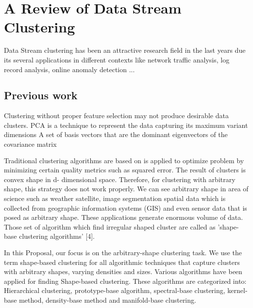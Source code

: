 \chapter{A Review of Data Stream Clustering}

Data Stream clustering has been an attractive research field in the last years due its several applications in different contexts like network traffic analysis, log record analysis, online anomaly detection ...


\section{Previous work}


Clustering without proper feature selection may not produce desirable data clusters.
PCA is a technique to represent the data capturing its maximum variant dimensions 
A set of basis vectors that are the dominant eigenvectors of the covariance matrix

\cite{blackholes}
Traditional clustering algorithms  are based on 
is applied to optimize problem by minimizing certain quality metrics such as squared error. The result of clusters is convex shape in d- dimensional space. Therefore, for clustering with arbitrary shape, this strategy does not work properly. We can see arbitrary shape in area of science such as weather satellite, image segmentation spatial data which is collected from geographic information systems (GIS) and even sensor data that is posed as arbitrary shape. These applications generate enormous volume of data. Those set of algorithm which find irregular shaped cluster are called as 'shape-base clustering algorithms' [4].

In this Proposal, our focus is on the arbitrary-shape clustering task. We use the term shape-based clustering for all algorithmic techniques that capture clusters with arbitrary shapes, varying densities and sizes. Various algorithms have been applied for finding Shape-based clustering. These algorithms are categorized into: Hierarchical clustering, prototype-base algorithm, spectral-base clustering, kernel-base method, density-base method and manifold-base clustering.




